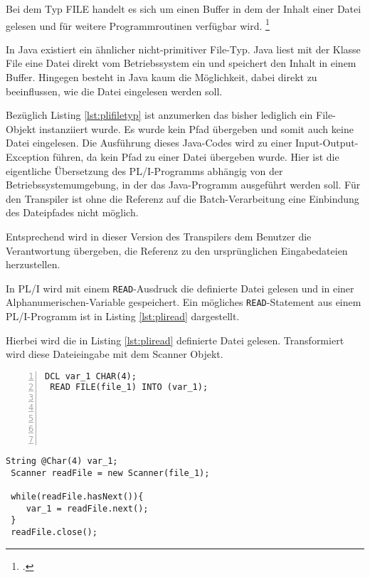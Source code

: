 Bei dem Typ FILE handelt es sich um einen Buffer in dem der Inhalt einer Datei gelesen und für weitere Programmroutinen verfügbar wird. \footcite[Vgl. ][ S.305ff. ]{pliref}

In Java existiert ein ähnlicher nicht-primitiver File-Typ.
Java liest mit der Klasse File eine Datei direkt vom Betriebssystem ein und speichert den Inhalt in einem Buffer. 
Hingegen besteht in Java kaum die Möglichkeit, dabei direkt zu beeinflussen, wie die Datei eingelesen werden soll.


Bezüglich Listing \ref{lst:plifiletyp} ist anzumerken das bisher lediglich ein File-Objekt instanziiert wurde.
Es wurde kein Pfad übergeben und somit auch keine Datei eingelesen. 
Die Ausführung dieses Java-Codes wird zu einer Input-Output-Exception führen, da kein Pfad zu einer Datei übergeben wurde. Hier ist die eigentliche Übersetzung des PL/I-Programms abhängig von der Betriebssystemumgebung, in der das Java-Programm ausgeführt werden soll. Für den Transpiler ist ohne die Referenz auf die Batch-Verarbeitung eine Einbindung des Dateipfades nicht möglich.

Entsprechend wird in dieser Version des Transpilers dem Benutzer die Verantwortung übergeben, die Referenz zu den ursprünglichen Eingabedateien herzustellen.

In PL/I wird mit einem \verb+READ+-Ausdruck die definierte Datei gelesen und in einer Alphanumerischen-Variable gespeichert. Ein mögliches \verb+READ+-Statement aus einem PL/I-Programm ist in Listing \ref{lst:pliread} dargestellt.

Hierbei wird die in Listing \ref{lst:pliread} definierte Datei gelesen.
Transformiert wird diese Dateieingabe mit dem Scanner Objekt.

\begin{minipage}[b]{0.48\linewidth}
	\centering
	\lstset{language=PL/I,label=SliceExaple}
	\begin{lstlisting}[frame=single, numbers=left, mathescape,%
		caption={Dateieingabe}, label={lst:pliread}, basicstyle=\fontsize{9}{13}\selectfont\ttfamily]
 DCL var_1 CHAR(4);
 READ FILE(file_1) INTO (var_1); 
		
		
		
		
		
	\end{lstlisting}
\end{minipage}
\hspace{0.5cm}
\begin{minipage}[b]{0.48\linewidth}
	\centering
	\lstset{language=Java,label=SliceExaple}
	\begin{lstlisting}[frame=single, mathescape,%
		title={" "},  basicstyle=\fontsize{9}{13}\selectfont\ttfamily]
 String @Char(4) var_1;
 Scanner readFile = new Scanner(file_1);
		
 while(readFile.hasNext()){
	var_1 = readFile.next();
 }
 readFile.close();
	\end{lstlisting}
\end{minipage}  


